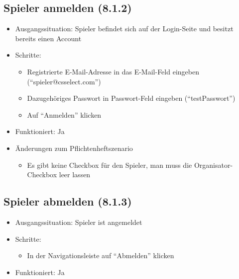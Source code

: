\documentclass[a4paper]{scrreprt}
\begin{document}
            \subsection{Spieler anmelden (8.1.2)}
            \begin{itemize}
                \item Ausgangssituation: Spieler befindet sich auf der Login-Seite und besitzt bereits einen Account
                \item Schritte:
                    \begin{itemize}
                        \item Registrierte E-Mail-Adresse in das E-Mail-Feld eingeben (\enquote{spieler@csselect.com})
                        \item Dazugehöriges Passwort in Passwort-Feld eingeben (\enquote{testPasswort})
                        \item Auf \enquote{Anmelden} klicken
                    \end{itemize}
                \item Funktioniert: Ja
                \item Änderungen zum Pflichtenheftszenario
                \begin{itemize}
                    \item Es gibt keine Checkbox für den Spieler, man muss die Organisator-Checkbox leer lassen
                \end{itemize}
            \end{itemize}

            \subsection{Spieler abmelden (8.1.3)}
            \begin{itemize}
                \item Ausgangssituation: Spieler ist angemeldet
                \item Schritte:
                    \begin{itemize}
                        \item In der Navigationsleiste auf \enquote{Abmelden} klicken
                    \end{itemize}
                \item Funktioniert: Ja
            \end{itemize}
\end{document}
